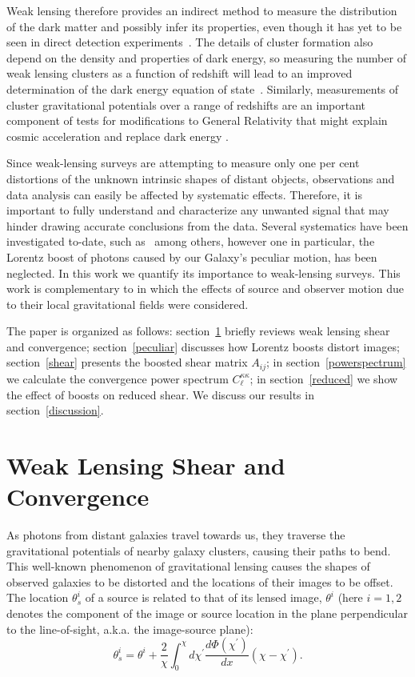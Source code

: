 \documentclass[useAMS,fleqn,usenatbib]{mn2e}
\begin{document}
Weak lensing therefore provides an indirect method to measure the  distribution of the dark matter and possibly
infer its properties, even though it has yet to be seen in direct detection experiments~\citep{Wright:1999jc}. 
The details of cluster formation also depend on the  density and properties of dark energy,
so  measuring the number of weak lensing clusters as a function of redshift 
will lead to an improved determination of the dark energy equation of state~\citep{Schneider:2005ka}. 
Similarly, measurements of cluster gravitational potentials over a range of redshifts 
are an important component of tests for modifications to General Relativity that might explain cosmic
acceleration and replace dark energy \citep{Lue:2004rj, Bean:2010zq}.

Since weak-lensing surveys are attempting to measure only one per cent distortions 
of the unknown intrinsic shapes of distant objects, observations and data analysis  
can easily be affected by systematic effects. Therefore,
it is important to fully understand and characterize any unwanted signal that
may hinder drawing accurate conclusions from the data. Several systematics have been investigated
to-date, such as~\citep{Cunha:2012us,Chang:2012cp,Yoo:2012vm,Chang:2012cn} among others, however one in particular,
the Lorentz boost of photons caused by our Galaxy's peculiar motion, has been neglected.
In this work we quantify its importance to weak-lensing surveys.   This work is complementary to \cite{Bonvin:2008ni} in which the effects of source and observer motion due to their local gravitational fields were considered.

The paper is organized as follows: section~\ref{wl_background} briefly reviews
weak lensing shear and convergence; section~\ref{peculiar}   discusses how Lorentz boosts distort images;
section~\ref{shear} presents
the boosted shear matrix $A_{ij}$; in section~\ref{powerspectrum} we calculate the convergence
power spectrum $C_{\ell}^{\kappa\kappa}$; in section~\ref{reduced} we show the effect of 
boosts on reduced shear. We discuss our results in section~\ref{discussion}.


\section{Weak Lensing Shear and Convergence}
\label{wl_background}

As photons from distant galaxies travel towards us, they  traverse the gravitational
potentials of nearby galaxy clusters, causing their paths  to bend. This well-known phenomenon of
gravitational lensing causes the shapes of  observed galaxies to be distorted and the locations of their
images to be offset.  The location  $\theta_s^i$ of a source
 is related to that of its  lensed image, $\theta^i$ 
 (here $i=1,2$ denotes the  component of the image or source location in the plane
 perpendicular to the line-of-sight, a.k.a. the image-source plane):
\begin{equation}\label{theta}
\theta_s^i=\theta^i+\frac{2}{\chi}\int_0^\chi d\chi^\prime \frac{d\Phi(\chi^{\prime})}{dx}\left(\chi - 
\chi^\prime \right).
\end{equation}
\end{document}
